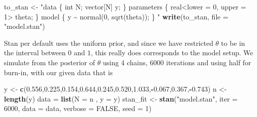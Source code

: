 \documentclass[
]{article}
\newenvironment{Shaded}{\begin{snugshade}}{\end{snugshade}}
\newcommand{\AttributeTok}[1]{\textcolor[rgb]{0.13,0.29,0.53}{#1}}
\newcommand{\ConstantTok}[1]{\textcolor[rgb]{0.56,0.35,0.01}{#1}}
\newcommand{\DecValTok}[1]{\textcolor[rgb]{0.00,0.00,0.81}{#1}}
\newcommand{\FloatTok}[1]{\textcolor[rgb]{0.00,0.00,0.81}{#1}}
\newcommand{\FunctionTok}[1]{\textcolor[rgb]{0.13,0.29,0.53}{\textbf{#1}}}
\newcommand{\NormalTok}[1]{#1}
\newcommand{\OtherTok}[1]{\textcolor[rgb]{0.56,0.35,0.01}{#1}}
\newcommand{\SpecialCharTok}[1]{\textcolor[rgb]{0.81,0.36,0.00}{\textbf{#1}}}
\newcommand{\StringTok}[1]{\textcolor[rgb]{0.31,0.60,0.02}{#1}}
\begin{document}
\begin{Shaded}
\begin{Highlighting}[]
\NormalTok{to\_stan }\OtherTok{\textless{}{-}} \StringTok{"data \{}
\StringTok{int N;}
\StringTok{vector[N] y;}
\StringTok{\}}
\StringTok{parameters \{}
\StringTok{real\textless{}lower = 0, upper = 1\textgreater{} theta;}
\StringTok{\}}
\StringTok{model \{}
\StringTok{y \textasciitilde{} normal(0, sqrt(theta));}
\StringTok{\}}
\StringTok{"}
\FunctionTok{write}\NormalTok{(to\_stan, }\AttributeTok{file =} \StringTok{"model.stan"}\NormalTok{)}
\end{Highlighting}
\end{Shaded}

Stan per default uses the uniform prior, and since we have restricted
\(\theta\) to be in the interval between \(0\) and \(1\), this really
does corresponds to the model setup. We simulate from the posterior of
\(\theta\) using 4 chains, 6000 iterations and using half for burn-in,
with our given data that is

\begin{Shaded}
\begin{Highlighting}[]
\NormalTok{y }\OtherTok{\textless{}{-}} \FunctionTok{c}\NormalTok{(}\FloatTok{0.556}\NormalTok{,}\FloatTok{0.225}\NormalTok{,}\FloatTok{0.154}\NormalTok{,}\FloatTok{0.644}\NormalTok{,}\FloatTok{0.245}\NormalTok{,}\FloatTok{0.520}\NormalTok{,}\FloatTok{1.033}\NormalTok{,}\SpecialCharTok{{-}}\FloatTok{0.067}\NormalTok{,}\FloatTok{0.367}\NormalTok{,}\SpecialCharTok{{-}}\FloatTok{0.743}\NormalTok{)}
\NormalTok{n }\OtherTok{\textless{}{-}} \FunctionTok{length}\NormalTok{(y)}
\NormalTok{data }\OtherTok{=} \FunctionTok{list}\NormalTok{(}\AttributeTok{N =}\NormalTok{ n , }\AttributeTok{y =}\NormalTok{ y)}
\NormalTok{stan\_fit }\OtherTok{\textless{}{-}} \FunctionTok{stan}\NormalTok{(}\StringTok{"model.stan"}\NormalTok{, }\AttributeTok{iter =} \DecValTok{6000}\NormalTok{, }\AttributeTok{data =}\NormalTok{ data, }\AttributeTok{verbose =} \ConstantTok{FALSE}\NormalTok{, }\AttributeTok{seed =} \DecValTok{1}\NormalTok{)}
\end{Highlighting}
\end{Shaded}
\end{document}
